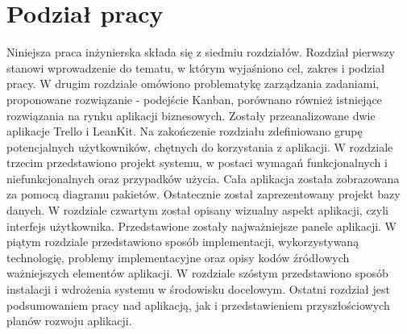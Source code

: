  \section{Podział pracy}
Niniejsza praca inżynierska składa się z siedmiu rozdziałów. Rozdział pierwszy stanowi wprowadzenie do tematu, w którym wyjaśniono cel, zakres i podział pracy. W drugim rozdziale omówiono problematykę zarządzania zadaniami, proponowane rozwiązanie - podejście Kanban, porównano również istniejące rozwiązania na rynku aplikacji biznesowych. Zostały przeanalizowane dwie aplikacje Trello i LeanKit. Na zakończenie rozdziału zdefiniowano grupę potencjalnych użytkowników, chętnych do korzystania z aplikacji. W rozdziale trzecim przedstawiono projekt systemu, w postaci wymagań funkcjonalnych i niefunkcjonalnych oraz przypadków użycia. Cała aplikacja została zobrazowana za pomocą diagramu pakietów. Ostatecznie został zaprezentowany projekt bazy danych. W rozdziale czwartym został opisany wizualny aspekt aplikacji, czyli interfejs użytkownika. Przedstawione zostały najważniejsze panele aplikacji. W piątym rozdziale przedstawiono sposób implementacji, wykorzystywaną technologię, problemy implementacyjne oraz opisy kodów źródłowych ważniejszych elementów aplikacji. W rozdziale szóstym przedstawiono sposób instalacji i wdrożenia systemu w środowisku docelowym. Ostatni rozdział jest podsumowaniem pracy nad aplikacją, jak i przedstawieniem przyszłościowych planów rozwoju aplikacji. 

